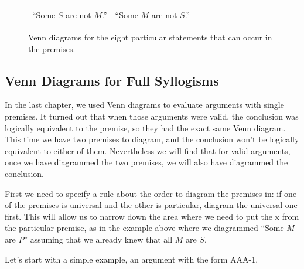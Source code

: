 \begin{figure}
\begin{mdframed}[style=mytablebox]
\begin{tabu}{X[1,c,m]X[1,c,m]}
&

\begin{center}
\end{center}

\\


``Some $S$ are not $M$.'' 
&
``Some $M$ are not $S$.'' 



\end{tabu}
\end{mdframed}
\caption{Venn diagrams for the eight particular statements that can occur in the premises.} \label{fig:part_venns}
\end{figure}


\subsection{Venn Diagrams for Full Syllogisms}

In the last chapter, we used Venn diagrams to evaluate arguments with single premises. It turned out that when those arguments were valid, the conclusion was logically equivalent to the premise, so they had the exact same Venn diagram. This time we have two premises to diagram, and the conclusion won't be logically equivalent to either of them. Nevertheless we will find that for valid arguments, once we have diagrammed the two premises, we will also have diagrammed the conclusion.

First we need to specify a rule about the order to diagram the premises in: if one of the premises is universal and the other is particular, diagram the universal one first. This will allow us to narrow down the area where we need to put the x from the particular premise, as in the example above where we diagrammed ``Some $M$ are $P$'' assuming that we already knew that all $M$ are $S$. 

Let's start with a simple example, an argument with the form AAA-1. 

